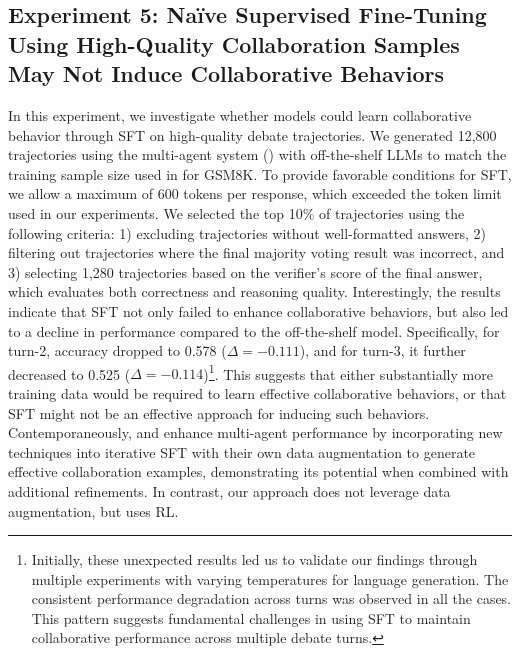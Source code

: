\subsection{Experiment 5: Naïve Supervised Fine-Tuning Using High-Quality Collaboration Samples May Not Induce Collaborative Behaviors} 
\label{sec:exp3}
In this experiment, we investigate whether models could learn collaborative behavior through SFT on high-quality debate trajectories. We generated 12,800 trajectories using the multi-agent system () with off-the-shelf LLMs to match the training sample size used in \oursspace for GSM8K. To provide favorable conditions for SFT, we allow a maximum of 600 tokens per response, which exceeded the token limit used in our \oursspace experiments.
We selected the top 10\% of trajectories using the following criteria: 1) excluding trajectories without well-formatted answers, 2) filtering out trajectories where the final majority voting result was incorrect, and 3) selecting 1,280 trajectories based on the verifier's score of the final answer, which evaluates both correctness and reasoning quality. Interestingly, the results indicate that SFT not only failed to enhance collaborative behaviors,  but also led to a decline in performance compared to the off-the-shelf model. Specifically, for turn-2, accuracy dropped to 0.578 (\(\Delta = -0.111\)), and for turn-3, it further decreased to 0.525 (\(\Delta = -0.114\))\footnote{Initially, these unexpected results led us to validate our findings through multiple experiments with varying temperatures  for language generation. The consistent performance degradation across turns was observed in all the cases. This pattern suggests fundamental challenges in using SFT to maintain collaborative performance across multiple debate turns.}. 
 This suggests that either substantially more training data would be required to learn effective collaborative behaviors, or that SFT might not be an effective approach for inducing such behaviors. {Contemporaneously, \citet{subramaniam2025multiagent} and \citet{zhao2025sirius} enhance multi-agent performance by incorporating new techniques into iterative SFT with their own data augmentation to generate effective collaboration examples, demonstrating its potential when combined with additional refinements. In contrast, our approach does not leverage data augmentation, but uses RL.}







